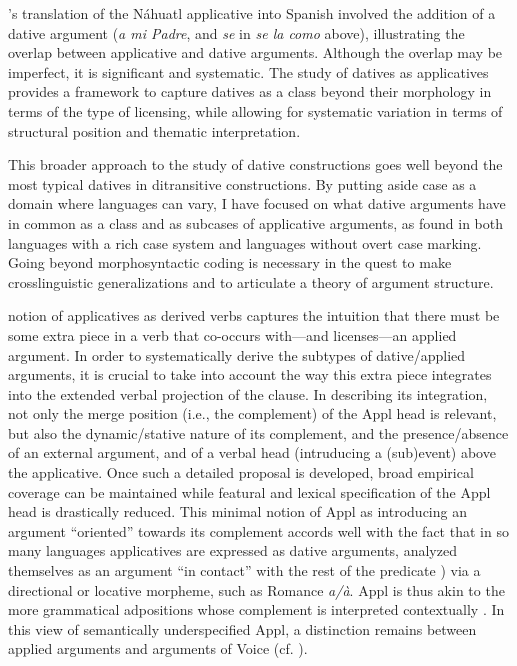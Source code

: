 \documentclass[output=paper,colorlinks,citecolor=brown,nonflat]{./langscibook}
\begin{document}
\citeauthor{Carochi1645}’s translation of the Náhuatl applicative into Spanish involved the addition of a dative argument (\textit{a mi Padre}, and \textit{se} in \textit{se la como} above),  illustrating the overlap between applicative and dative arguments. Although the overlap may be imperfect, it is significant and systematic. The study of datives as applicatives provides a framework to capture datives as a class beyond their morphology in terms of the type of licensing, while allowing for systematic variation in terms of structural position and thematic interpretation.

This broader approach to the study of dative constructions goes well beyond the most typical datives in ditransitive constructions. By putting aside case as a domain where languages can vary, I have focused on what dative arguments have in common as a class and as subcases of applicative arguments, as found in both languages with a rich case system and languages without overt case marking. Going beyond morphosyntactic coding is necessary in the quest to make crosslinguistic generalizations and to articulate a theory of argument structure.

 notion of applicatives as derived verbs captures the intuition that there must be some extra piece in a verb that co-occurs with—and licenses—an applied argument. In order to systematically derive the subtypes of dative/applied arguments, it is crucial to take into account the way this extra piece integrates into the extended verbal projection of the clause. In describing its integration, not only the merge position (i.e., the complement) of the Appl head is relevant, but also the dynamic/stative nature of its complement, and the presence/absence of an external argument, and of a verbal head (intruducing a (sub)event) above the applicative. Once such a detailed proposal is developed, broad empirical coverage can be maintained while featural and lexical specification of the Appl head is drastically reduced. This minimal notion of Appl as introducing an argument “oriented” towards its complement accords well with the fact that in so many languages applicatives are expressed as dative arguments, analyzed themselves as an argument “in contact” with the rest of the predicate ) via a directional or locative morpheme, such as Romance \textit{a/à}. Appl is thus akin to the more grammatical adpositions whose complement is interpreted contextually \citep{Svenonius2007}. In this view of semantically underspecified Appl, a distinction remains between applied arguments and arguments of Voice (cf. \citealt{WoodMarantz2017}).
\end{document}
